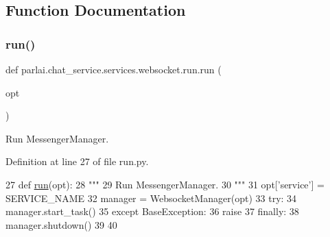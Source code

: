 \subsection{Function Documentation}
\mbox{\label{namespaceparlai_1_1chat__service_1_1services_1_1websocket_1_1run_aa7edf5a6148ae51bad84b084237002fe}} 
\subsubsection{\texorpdfstring{run()}{run()}}
{\footnotesize\ttfamily def parlai.\+chat\+\_\+service.\+services.\+websocket.\+run.\+run (\begin{DoxyParamCaption}\item[{}]{opt }\end{DoxyParamCaption})}

\begin{DoxyVerb}Run MessengerManager.
\end{DoxyVerb}
 

Definition at line 27 of file run.\+py.


\begin{DoxyCode}
27 \textcolor{keyword}{def }\hyperlink{namespaceparlai_1_1tasks_1_1talkthewalk_1_1run_a0a1ec08b8196cb008e4df83468c67e5b}{run}(opt):
28     \textcolor{stringliteral}{"""}
29 \textcolor{stringliteral}{    Run MessengerManager.}
30 \textcolor{stringliteral}{    """}
31     opt[\textcolor{stringliteral}{'service'}] = SERVICE\_NAME
32     manager = WebsocketManager(opt)
33     \textcolor{keywordflow}{try}:
34         manager.start\_task()
35     \textcolor{keywordflow}{except} BaseException:
36         \textcolor{keywordflow}{raise}
37     \textcolor{keywordflow}{finally}:
38         manager.shutdown()
39 
40 
\end{DoxyCode}
\mbox{\label{namespaceparlai_1_1chat__service_1_1services_1_1websocket_1_1run_a3335f62a1f0f68151449b8ecef1d9908}} 
